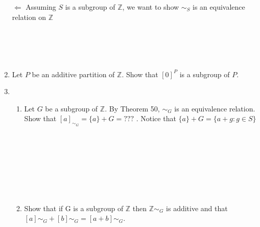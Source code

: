\documentclass[11pt]{article}
\begin{document}
\begin{enumerate}
$\Leftarrow$ Assuming $S$ is a subgroup of $\mathbb{Z}$, we want to show $\sim_S$ is an equivalence relation on $\mathbb{Z}$
\\
\\
\\
\\
\\

\newpage %
\item Let $P$ be an additive partition of $\mathbb{Z}$. Show that $[0]^P$ is a subgroup of $P$.


\newpage %
\item
\begin{enumerate}
\item Let $G$ be a subgroup of $\mathbb{Z}$. By Theorem 50, $\sim_G$ is an equivalence relation. Show that $[a]_{\sim_G} = \{a\}+G = ???$ . Notice that $\{a\} + G = \{a + g : g \in S\}$
\\
\\
\\
\\
\\
\\
\\
\\

\item Show that if G is a subgroup of $\mathbb{Z}$ then $\mathbb{Z}\sim_G$ is additive and that $[a]\sim_G + [b]\sim_G = [a + b]\sim_G$.
\\
\\
\\
\\
\\
\\
\\

\end{enumerate}


\end{enumerate} %
\end{document}
